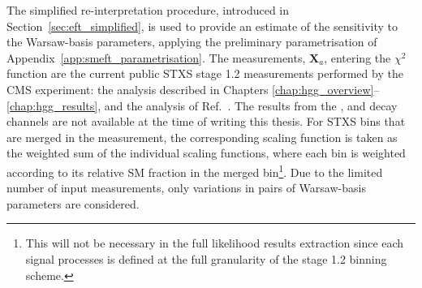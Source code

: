 The simplified re-interpretation procedure, introduced in Section~\ref{sec:eft_simplified}, is used to provide an estimate of the sensitivity to the Warsaw-basis parameters, applying the preliminary parametrisation of Appendix~\ref{app:smeft_parametrisation}. The measurements, $\mathbf{X}_a$, entering the $\chi^2$ function are the current public STXS stage 1.2 measurements performed by the CMS experiment: the \Hgg analysis described in Chapters \ref{chap:hgg_overview}--\ref{chap:hgg_results}, and the \Hfl analysis of Ref.~\cite{Sirunyan:2021rug}. The results from the \Htautau, \Hbb and \HWW decay channels are not available at the time of writing this thesis. For STXS bins that are merged in the measurement, the corresponding scaling function is taken as the weighted sum of the individual scaling functions, where each bin is weighted according to its relative SM fraction in the merged bin\footnote{This will not be necessary in the full likelihood results extraction since each signal processes is defined at the full granularity of the stage 1.2 binning scheme.}. Due to the limited number of input measurements, only variations in pairs of Warsaw-basis parameters are considered.

